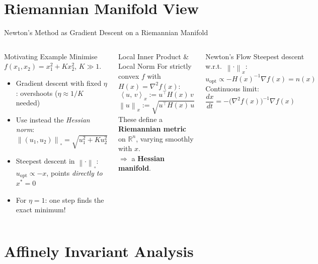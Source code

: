 \documentclass[aspectratio=169,10pt]{beamer}
\newcommand{\R}{\mathbb{R}}
\newcommand{\Hess}{\nabla^2}
\newcommand{\grad}{\nabla}
\newcommand{\norm}[1]{\left\|#1\right\|}
\newcommand{\lnorm}[2]{\left\|#1\right\|_{#2}}
\newcommand{\ip}[2]{\left\langle #1,\, #2 \right\rangle}
\begin{document}
\section{Riemannian Manifold View}

\begin{frame}{Newton's Method as Gradient Descent on a Riemannian Manifold}
  \begin{columns}[T]
      \begin{block}{Motivating Example}
        Minimise $f(x_1,x_2)=x_1^2+Kx_2^2$, $K\gg 1$.
        \vspace{0.2em}
        \begin{itemize}
          \item Gradient descent with fixed $\eta$: overshoots ($\eta\approx 1/K$ needed)
          \item Use instead the \emph{Hessian norm}:
                $\norm{(u_1,u_2)}_\circ = \sqrt{u_1^2+Ku_2^2}$
          \item Steepest descent in $\norm{\cdot}_\circ$:
                $u_\text{opt} \propto -x$, points \emph{directly to $x^*=0$}
          \item For $\eta=1$: one step finds the exact minimum!
        \end{itemize}
      \end{block}

      \begin{block}{Local Inner Product \& Local Norm}
        For strictly convex $f$ with $H(x)=\Hess f(x)$:
        \[
          \ip{u}{v}_x := u^\top H(x)\,v
        \]
        \[
          \lnorm{u}{x} := \sqrt{u^\top H(x)\,u}
        \]
        These define a \textbf{Riemannian metric} on $\R^n$,
        varying smoothly with $x$.\\[0.3em]
        $\Rightarrow$ a \textbf{Hessian manifold}.
      \end{block}
      \begin{exampleblock}{Newton's Flow}
        Steepest descent w.r.t.\ $\lnorm{\cdot}{x}$:
        \[
          u_\text{opt} \propto -H(x)^{-1}\grad f(x) = n(x)
        \]
        Continuous limit:
        $\dfrac{dx}{dt} = -\bigl(\Hess f(x)\bigr)^{-1}\grad f(x)$
      \end{exampleblock}
  \end{columns}
\end{frame}

\section{Affinely Invariant Analysis}
\end{document}
